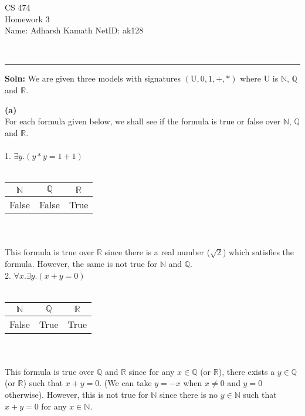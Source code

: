\documentclass[12pt,letterpaper, onecolumn]{exam}
\begin{document}
\begingroup
\centering
\LARGE CS 474\\
\large Homework 3 \\[0.5em]
\endgroup
\begingroup
\normalsize \quad\quad\quad Name: Adharsh Kamath \quad\quad\quad \quad\quad\quad \quad\quad\quad \quad\quad\quad \quad  NetID: ak128 \par\
\endgroup
\rule{17cm}{0.4pt}
\pointsdroppedatright   %
\printanswers
\renewcommand{\solutiontitle}{\noindent\textbf{Soln:}\enspace}
\newcommand{\cheading}[1]{{\underline{\textit{#1}}}}

\renewcommand{\questionshook}{%
	\setlength{\leftmargin}{18pt}%
	\setlength{\labelwidth}{-\labelsep}%
}
\begin{questions}
	\question[]
	\solutiontitle
	We are given three models with signatures $ (\text{U}, 0, 1, +, *) $ where $ \text{U} $ is $\mathbb{N}$, $\mathbb{Q}$ and $\mathbb{R}$.

	\textbf{(a)} \\
	For each formula given below, we shall see if the formula is true or false over $\mathbb{N}$, $\mathbb{Q}$ and $\mathbb{R}$. \\ \\
	1. $ \exists y. ( y * y = 1 + 1 ) $ \\ \\
	\begin{tabular}{ |c|c|c| }
		\hline
		$\mathbb{N}$ & $\mathbb{Q}$ & $\mathbb{R}$ \\
		\hline
		False & False & True \\
		\hline
	\end{tabular} \\ \\
	This formula is true over $\mathbb{R}$ since there is a real number ($ \sqrt{2} $) which satisfies the formula. However, the same is not true
	for $\mathbb{N}$ and $\mathbb{Q}$. \\

	2. $ \forall x. \exists y. (x + y = 0) $ \\ \\
	\begin{tabular}{ |c|c|c| }
		\hline
		$\mathbb{N}$ & $\mathbb{Q}$ & $\mathbb{R}$ \\
		\hline
		False & True & True \\
		\hline
	\end{tabular} \\ \\
	This formula is true over $\mathbb{Q}$ and $\mathbb{R}$ since for any $x \in \mathbb{Q}$ (or $\mathbb{R}$), there exists a 
	$y \in \mathbb{Q}$ (or $\mathbb{R}$) such that $x + y = 0$. (We can take $y = -x$ when $ x \neq 0 $ and $ y = 0 $ otherwise).
	However, this is not true for $\mathbb{N}$ since there is no $y \in \mathbb{N}$ such that $x + y = 0$ for any $x \in \mathbb{N}$. \\


\end{questions}
\end{document}
